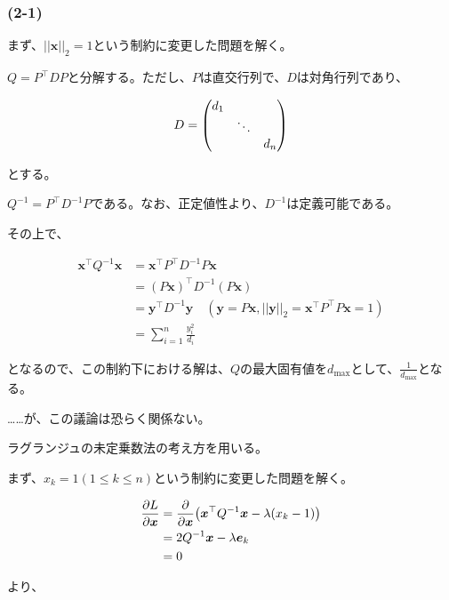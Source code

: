 \documentclass[a4paper, 10pt, dvipdfmx]{jlreq}
\begin{document}
\subsubsection*{(2-1)}

{\color{lightgray}

  まず、$||\bm{x}||_2=1$という制約に変更した問題を解く。

  $Q=P^\top DP$と分解する。ただし、$P$は直交行列で、$D$は対角行列であり、

  \begin{align*}
    D=\mqty(d_1 &  & \\ & \ddots & \\ & & d_n)
  \end{align*}

  とする。

  $Q^{-1}=P^\top D^{-1}P$である。なお、正定値性より、$D^{-1}$は定義可能である。

  その上で、

  \begin{align*}
    \bm{x}^\top Q^{-1}\bm{x} & = \bm{x}^\top P^\top D^{-1}P\bm{x}                                                          \\
                             & = (P\bm{x})^\top D^{-1}(P\bm{x})                                                            \\
                             & = \bm{y}^\top D^{-1}\bm{y} \quad (\bm{y}=P\bm{x},||\bm{y}||_2=\bm{x}^\top P^\top P\bm{x}=1) \\
                             & = \sum_{i=1}^{n}\frac{y_i^2}{d_i}
  \end{align*}

  となるので、この制約下における解は、$Q$の最大固有値を$d_{\text{max}}$として、$\frac{1}{d_{\text{max}}}$となる。

}

……が、この議論は恐らく関係ない。

ラグランジュの未定乗数法の考え方を用いる。

まず、$x_k=1(1\leq k \leq n)$という制約に変更した問題を解く。

\begin{align*}
  \pdv{L}{\bm{x}} & =\pdv{\bm{x}} \qty(\bm{x}^\top Q^{-1}\bm{x}-\lambda(x_k-1)) \\
                  & = 2Q^{-1}\bm{x}-\lambda \bm{e}_k                            \\
                  & = 0
\end{align*}

より、
\end{document}
